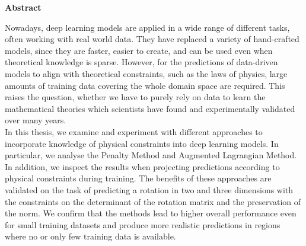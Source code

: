 


\vspace*{2cm}
\begin{center}
{\Large \textbf{Abstract}}
\end{center}
\vspace{1cm}


Nowadays, deep learning models are applied in a wide range of different tasks, often working with real world data. They have replaced a variety of hand-crafted models, since they are faster, easier to create, and can be used even when theoretical knowledge is sparse. However, for the predictions of data-driven models to align with theoretical constraints, such as the laws of physics, large amounts of training data covering the whole domain space are required. This raises the question, whether we have to purely rely on data to learn the mathematical theories which scientists have found and experimentally validated over many years. \\
\indent In this thesis, we examine and experiment with different approaches to incorporate knowledge of physical constraints into deep learning models. In particular, we analyse the Penalty Method and Augmented Lagrangian Method. In addition, we inspect the results when projecting predictions according to physical constraints during training. The benefits of these approaches are validated on the task of predicting a rotation in two and three dimensions with the constraints on the determinant of the rotation matrix and the preservation of the norm. We confirm that the methods lead to higher overall performance even for small training datasets and produce more realistic predictions in regions where no or only few training data is available.
